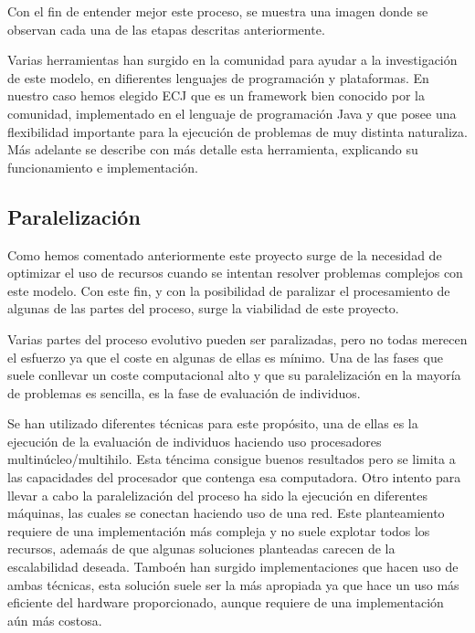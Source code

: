 Con el fin de entender mejor este proceso, se muestra una imagen  donde se observan cada una de las etapas descritas anteriormente.


Varias herramientas han surgido en la comunidad para ayudar a la investigación de este modelo, en difierentes lenguajes de programación y plataformas. En nuestro caso hemos elegido ECJ que es un framework bien conocido por la comunidad, implementado en el lenguaje de programación Java y que posee una flexibilidad importante para la ejecución de problemas de muy distinta naturaliza. M\'as adelante  se describe con m\'as detalle esta herramienta, explicando su funcionamiento e implementación.

\subsection{Paralelizaci\'on}

Como hemos comentado anteriormente  este proyecto surge de la necesidad de optimizar el uso de recursos cuando se intentan resolver problemas complejos con este modelo. Con este fin, y con la posibilidad de paralizar el procesamiento de algunas de las partes del proceso, surge la viabilidad de este proyecto.

Varias partes del proceso evolutivo pueden ser paralizadas, pero no todas merecen el esfuerzo ya que el coste en algunas de ellas es mínimo. Una de las fases que suele conllevar un coste computacional alto y que su paralelizaci\'on en la mayoría de problemas es sencilla, es la fase de evaluaci\'on de individuos.

Se han utilizado diferentes técnicas para este prop\'osito, una de ellas es la ejecución de la evaluación de individuos haciendo uso procesadores multin\'ucleo/multihilo. Esta t\'encima consigue buenos resultados pero se limita a las capacidades del procesador que contenga esa computadora. Otro intento para llevar a cabo la paralelizaci\'on del proceso ha sido la ejecución en diferentes m\'aquinas, las cuales se conectan haciendo uso de una red. Este planteamiento requiere de una implementación m\'as compleja y no suele explotar todos los recursos, adema\'as de que algunas soluciones planteadas carecen de la escalabilidad deseada. Tambo\'en han surgido implementaciones que hacen uso de ambas t\'ecnicas, esta solución suele ser la m\'as apropiada ya que hace un uso m\'as eficiente del hardware proporcionado, aunque requiere de una implementación a\'un m\'as costosa.